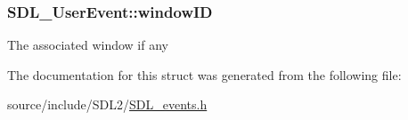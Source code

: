\subsubsection[{window\+I\+D}]{ S\+D\+L\+\_\+\+User\+Event\+::window\+I\+D}\label{struct_s_d_l___user_event_abccefa10e0e0e3a0801bc6d836a08da7}
The associated window if any 

The documentation for this struct was generated from the following file\+:\begin{DoxyCompactItemize}
\item 
source/include/\+S\+D\+L2/\hyperlink{_s_d_l__events_8h}{S\+D\+L\+\_\+events.\+h}\end{DoxyCompactItemize}
